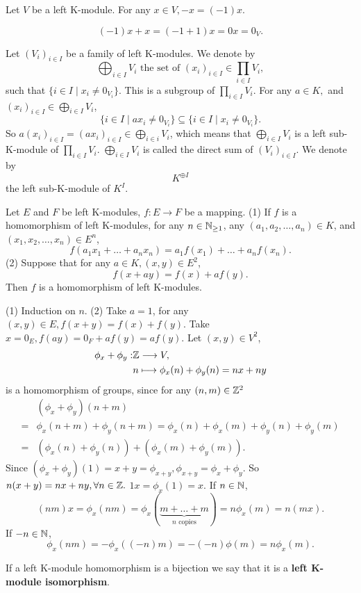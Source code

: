 \documentclass{book}
\numberwithin{equation}{section}
\begin{document}
\begin{propositionenv}
    Let $V$ be a left K-module. For any $x\in V, -x=(-1)x$.
\end{propositionenv}
\begin{proofenv}
    $$(-1)x+x=(-1+1)x=0x=0_V.$$
\end{proofenv}
\begin{exampleenv}
    Let $(V_i)_{i\in I}$ be a family of left K-modules. We denote by 
    $$\bigoplus_{i\in I}V_i\text{ the set of }(x_i)_{i\in I}\in \prod_{i\in I}V_i,$$
    such that $\{i\in I\mid x_i\not=0_{V_i}\}$. This is a subgroup of $\prod_{i\in I}V_i$. For any $a\in K,$ and $(x_i)_{i\in I}\in \bigoplus_{i\in I}V_i$,
    $$\{i\in I\mid ax_i\not=0_{V_i}\}\subseteq\{i\in I\mid x_i\not=0_{V_i}\}.$$
    So $\displaystyle a(x_i)_{i\in I}=(ax_i)_{i\in I}\in \bigoplus_{i\in i}V_i$, which means that $\displaystyle\bigoplus_{i\in I}V_i$ is a left sub-K-module of $\displaystyle\prod_{i\in I}V_i$. $\displaystyle\bigoplus_{i\in I}V_i$ is called the direct sum of $(V_i)_{i\in I}$. We denote by 
    $$K^{\oplus I}$$
    the left sub-K-module of $K^I$.
\end{exampleenv}
\begin{propositionenv}
    Let $E$ and $F$ be left K-modules, $f:E\rightarrow F$ be a mapping.
    \newline
    (1) If $f$ is a homomorphism of left K-modules, for any $n\in \mathbb{N}_{\ge1}$, any $(a_1,a_2,\dots,a_n)\in K$, and $(x_1,x_2,\dots,x_n)\in E^n$,
    $$f(a_1x_1+\dots+a_nx_n)=a_1f(x_1)+\dots+a_nf(x_n).$$
    (2) Suppose that for any $a\in K,(x,y)\in E^2$,
    $$f(x+ay)=f(x)+af(y).$$
    Then $f$ is a homomorphism of left K-modules.
\end{propositionenv}
\begin{proofenv}
    (1) Induction on $n$.
    \newline
    (2) Take $a=1$, for any $(x,y)\in E,f(x+y)=f(x)+f(y)$. Take $x=0_E,f(ay)=0_F+af(y)=af(y)$. Let $(x,y)\in V^2$,
    \begin{align*}
        \phi_x+\phi_y:&\mathbb{Z} \longrightarrow V,\\
        &n\longmapsto \phi_x(n)+\phi_y(n)=nx+ny
    \end{align*}
    is a homomorphism of groups, since for any $(n,m)\in \mathbb{Z}^2$
    \begin{align*}
        &(\phi_x+\phi_y)(n+m)\\
        =&\phi_x(n+m)+\phi_y(n+m)=\phi_x(n)+\phi_x(m)+\phi_y(n)+\phi_y(m)\\
        =&(\phi_x(n)+\phi_y(n))+(\phi_x(m)+\phi_y(m)).
    \end{align*}
    Since $(\phi_x+\phi_y)(1)=x+y=\phi_{x+y},\phi_{x+y}=\phi_x+\phi_y.$ So $n(x+y)=nx+ny, \forall n\in\mathbb{Z}.$ $1x=\phi_x(1)=x.$
    If $n\in \mathbb{N}$,
    $$(nm)x=\phi_x(nm)=\phi_x(\underset{n \text{ copies}}{\underbrace{m+\dots+m}})=n\phi_x(m)=n(mx).$$
    If $-n\in \mathbb{N}$,
    $$\phi_x(nm)=-\phi_x((-n)m)=-(-n)\phi(m)=n\phi_x(m).$$
\end{proofenv}
\begin{definitionenv}
    If a left K-module homomorphism is a bijection we say that it is a \textbf{left K-module isomorphism}.
\end{definitionenv}
\end{document}
